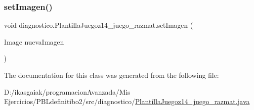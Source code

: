 \mbox{\label{classdiagnostico_1_1_plantilla_juegoz14__juego__razmat_a5f01b3186a4d496fb5623da0ac2108b6}} 
\subsubsection{\texorpdfstring{set\+Imagen()}{setImagen()}}
{\footnotesize\ttfamily void diagnostico.\+Plantilla\+Juegoz14\+\_\+juego\+\_\+razmat.\+set\+Imagen (\begin{DoxyParamCaption}\item[{Image}]{nueva\+Imagen }\end{DoxyParamCaption})}



The documentation for this class was generated from the following file\+:\begin{DoxyCompactItemize}
\item 
D\+:/ikasgaiak/programacion\+Avanzada/\+Mis Ejercicios/\+P\+B\+Ldefinitibo2/src/diagnostico/\mbox{\hyperlink{_plantilla_juegoz14__juego__razmat_8java}{Plantilla\+Juegoz14\+\_\+juego\+\_\+razmat.\+java}}\end{DoxyCompactItemize}
